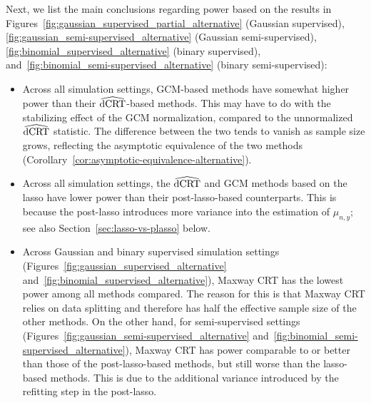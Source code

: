 \documentclass[12pt]{article}
\theoremstyle{definition}
\theoremstyle{remark}
\newcommand{\dCRThat}{\widehat{\textnormal{dCRT}}}		%
\begin{document}
	Next, we list the main conclusions regarding power based on the results in Figures~\ref{fig:gaussian_supervised_partial_alternative} (Gaussian supervised), \ref{fig:gaussian_semi-supervised_alternative} (Gaussian semi-supervised), \ref{fig:binomial_supervised_alternative} (binary supervised), and~\ref{fig:binomial_semi-supervised_alternative} (binary semi-supervised): 
	\begin{itemize}
		\item Across all simulation settings, GCM-based methods have somewhat higher power than their $\dCRThat$-based methods. This may have to do with the stabilizing effect of the GCM normalization, compared to the unnormalized $\dCRThat$ statistic. The difference between the two tends to vanish as sample size grows, reflecting the asymptotic equivalence of the two methods (Corollary~\ref{cor:asymptotic-equivalence-alternative}).
		\item Across all simulation settings, the $\dCRThat$ and GCM methods based on the lasso have lower power than their post-lasso-based counterparts. This is because the post-lasso introduces more variance into the estimation of $\mu_{n,y}$; see also Section~\ref{sec:lasso-vs-plasso} below.
		\item Across Gaussian and binary supervised simulation settings (Figures~\ref{fig:gaussian_supervised_alternative} and~\ref{fig:binomial_supervised_alternative}), Maxway CRT has the lowest power among all methods compared. The reason for this is that Maxway CRT relies on data splitting and therefore has half the effective sample size of the other methods. On the other hand, for semi-supervised settings (Figures~\ref{fig:gaussian_semi-supervised_alternative} and~\ref{fig:binomial_semi-supervised_alternative}), Maxway CRT has power comparable to or better than those of the post-lasso-based methods, but still worse than the lasso-based methods. This is due to the additional variance introduced by the refitting step in the post-lasso.
	\end{itemize}
	
\end{document}
